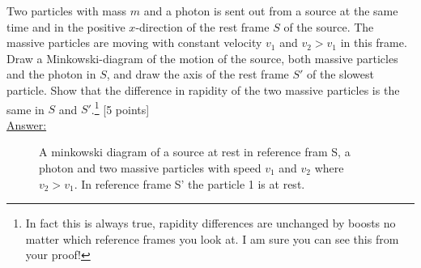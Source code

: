 \documentclass[11pt,a4paper]{report}
\newcounter{excount}[chapter]
\newenvironment{exercise}[1][]{\addtocounter{excount}{1} \noindent {\bf Question
    \arabic{excount} \ \ #1}\hspace{2mm}}{\vspace{4mm}}
\begin{document}
\begin{exercise}{\bf Relativistics\\}
Two particles with mass $m$ and a photon is sent out from a source at the same time and in the positive $x$-direction of the rest frame $S$ of the source. The massive particles are moving with constant velocity $v_1$ and $v_2>v_1$ in this frame. Draw a Minkowski-diagram of the motion of the source, both massive particles and the photon in $S$, and draw the axis of the rest frame $S'$ of the slowest particle. Show that the difference in rapidity of the two massive particles is the same in $S$ and $S'$.\footnote{In fact this is always true, rapidity differences are unchanged by boosts no matter which reference frames you look at. I am sure you can see this from your proof!} [5 points]\\



\underline{Answer:}\\
\begin{figure}[h!]
\centering
\caption{A minkowski diagram of a source at rest in reference fram S, a photon and two massive particles with speed $v_1$ and $v_2$ where $v_2 > v_1$. In reference frame S' the particle 1 is at rest.}
\end{figure}









\end{exercise}
\end{document}
